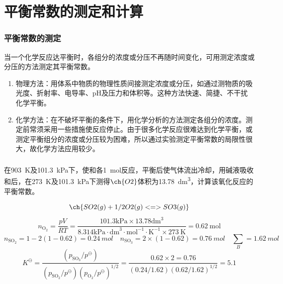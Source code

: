 \section{平衡常数的测定和计算}


\begin{frame}
    \frametitle{平衡常数的测定}

    当一个化学反应达平衡时，各组分的浓度或分压不再随时间变化，可用测定浓度或分压的方法测定其平衡常数。
    \begin{enumerate}
        \item 物理方法：用体系中物质的物理性质间接测定浓度或分压，如通过测物质的吸光度、折射率、电导率、pH及压力和体积等。这种方法快速、简捷、不干扰化学平衡。
        \item 化学方法：在不破坏平衡的条件下，用化学分析的方法测定各组分的浓度。测定前常须采用一些措施使反应停止。由于很多化学反应很难达到化学平衡，或测定平衡组分的浓度或分压较为困难，所以通过实验测定平衡常数的局限性很大，故化学方法应用较少。
    \end{enumerate}

\end{frame}


\begin{frame}
    \frametitle{}

    \begin{example}
        在\SI{903}{K}及\SI{101.3}{kPa}下，使和各\SI{1}{mol}反应，平衡后使气体流出冷却，用碱液吸收和后，在\SI{273}{K}及\SI{101.3}{kPa}下测得$\ch{O2}$体积为\SI{13.78}{dm^3}，计算该氧化反应的平衡常数。
    \end{example}
    \pause
    \[
        \ch{SO2(g) + 1/2 O2(g) <=> SO3(g)}
    \]
    \[
        n_{\mathrm{O}_{2}}=\frac{p V}{R T}=\frac{101.3 \mathrm{kPa} \times 13.78 \mathrm{dm}^{3}}{8.314 \mathrm{kPa} \cdot \mathrm{dm}^{3} \cdot \mathrm{mol}^{-1} \cdot \mathrm{K}^{-1} \times 273 \mathrm{~K}}=0.62 \mathrm{~mol}
    \]
    \[
        n_{\mathrm{SO}_{2}}=1-2(1-0.62)= \SI{0.24}{mol} \quad n_{\mathrm{SO}_{3}}=2 \times (1-0.62) = \SI{0.76}{mol} \quad \sum_B = \SI{1.62}{mol}
    \]
    \[
        K^{\ominus}=\frac{(p_{\mathrm{SO}_{3}} / p^{\ominus})}{(p_{\mathrm{SO}_{2}} / p^{\ominus})(p_{\mathrm{O}_{2}} / p^{\ominus})^{1 / 2}}=\frac{0.62 \times 2=0.76}{(0.24 / 1.62)(0.62 / 1.62)^{1 / 2}}=5.1
    \]

\end{frame}



